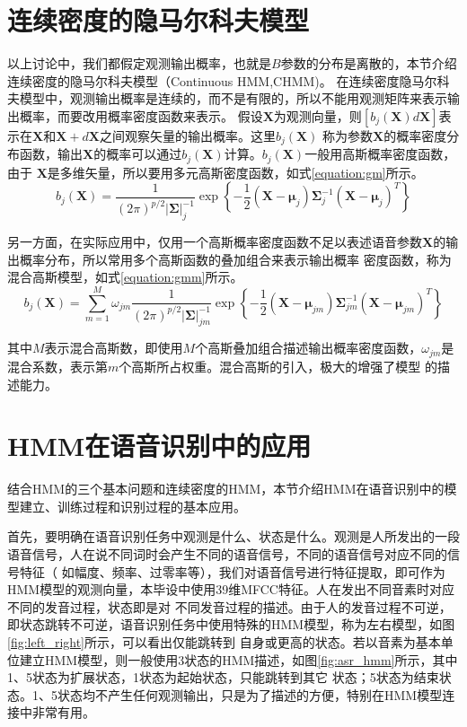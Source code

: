 \section{连续密度的隐马尔科夫模型}

    以上讨论中，我们都假定观测输出概率，也就是$B$参数的分布是离散的，本节介绍连续密度的隐马尔科夫模型（Continuous HMM,CHMM)。
    在连续密度隐马尔科夫模型中，观测输出概率是连续的，而不是有限的，所以不能用观测矩阵来表示输出概率，而要改用概率密度函数来表示。
    假设$\bm{X}$为观测向量，则$[b_{j}(\bm{X})d\bm{X}]$表示在$\bm{X}$和$\bm{X}+d\bm{X}$之间观察矢量的输出概率。这里$b_{j}(\bm{X})$
    称为参数$\bm{X}$的概率密度分布函数，输出$\bm{X}$的概率可以通过$b_{j}(\bm{X})$计算。$b_{j}(\bm{X})$一般用高斯概率密度函数，由于
    $\bm{X}$是多维矢量，所以要用多元高斯密度函数，如式\ref{equation:gm}所示。
    \begin{equation}\label{equation:gm}
       {b_j}(\bm{X}) = \frac{1}{{{{(2\pi )}^{p/2}}{|{\bm{\Sigma}} |_j^{ - 1}}}}\exp \left\{ { - \frac{1}{2}(\bm{X} - {{\bm{\mu}} _j}) {\bm{\Sigma}}_j^{ - 1}{{(\bm{X} - {{\bm{\mu}}_j})}^T}} \right\}
    \end{equation}

    另一方面，在实际应用中，仅用一个高斯概率密度函数不足以表述语音参数$\bm{X}$的输出概率分布，所以常用多个高斯函数的叠加组合来表示输出概率
    密度函数，称为混合高斯模型，如式\ref{equation:gmm}所示。
    \begin{equation}\label{equation:gmm}
       {b_j}(\bm{X}) = \sum\limits_{m = 1}^M {{\omega _{jm}}} \frac{1}{{{{(2\pi )}^{p/2}}|{\bm{\Sigma}} |_{jm}^{ - 1}}}\exp \left\{ { - \frac{1}{2}(\bm{X} - {{\bm{\mu}} _{jm}}){\bm{\Sigma}}_{jm}^{ - 1}{{(\bm{X} - {{\bm{\mu}} _{jm}})}^T}} \right\}
    \end{equation}

    其中$M$表示混合高斯数，即使用$M$个高斯叠加组合描述输出概率密度函数，${\omega_{jm}}$是混合系数，表示第$m$个高斯所占权重。混合高斯的引入，极大的增强了模型
    的描述能力。


\section{HMM在语音识别中的应用}
    结合HMM的三个基本问题和连续密度的HMM，本节介绍HMM在语音识别中的模型建立、训练过程和识别过程的基本应用。

    首先，要明确在语音识别任务中观测是什么、状态是什么。观测是人所发出的一段语音信号，人在说不同词时会产生不同的语音信号，不同的语音信号对应不同的信号特征（
    如幅度、频率、过零率等），我们对语音信号进行特征提取，即可作为HMM模型的观测向量，本毕设中使用39维MFCC特征。人在发出不同音素时对应不同的发音过程，状态即是对
    不同发音过程的描述。由于人的发音过程不可逆，即状态跳转不可逆，语音识别任务中使用特殊的HMM模型，称为左右模型，如图\ref{fig:left_right}所示，可以看出仅能跳转到
    自身或更高的状态。若以音素为基本单位建立HMM模型，则一般使用3状态的HMM描述，如图\ref{fig:asr_hmm}所示，其中1、5状态为扩展状态，1状态为起始状态，只能跳转到其它
    状态；5状态为结束状态。1、5状态均不产生任何观测输出，只是为了描述的方便，特别在HMM模型连接中非常有用。

